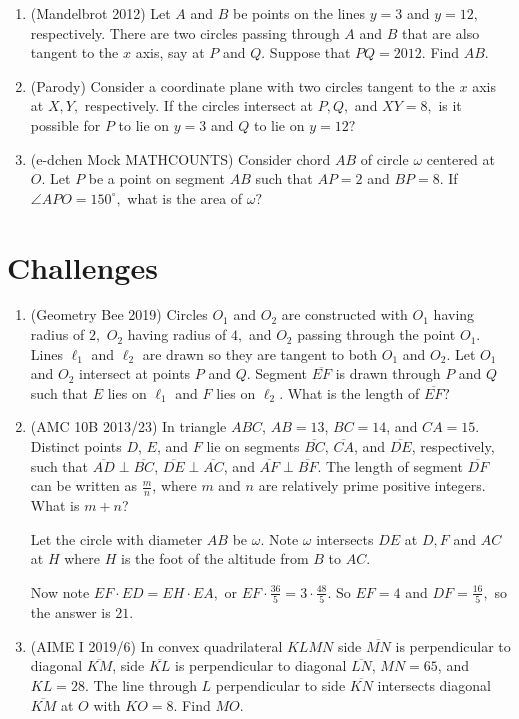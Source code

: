 \begin{enumerate}
\item (Mandelbrot 2012) Let $A$ and $B$ be points on the lines $y=3$ and $y=12,$ respectively. There are two circles passing through $A$ and $B$ that are also tangent to the $x$ axis, say at $P$ and $Q.$ Suppose that $PQ=2012.$ Find $AB.$

\item (Parody) Consider a coordinate plane with two circles tangent to the $x$ axis at $X,Y,$ respectively. If the circles intersect at $P,Q,$ and $XY=8,$ is it possible for $P$ to lie on $y=3$ and $Q$ to lie on $y=12?$

\item (e-dchen Mock MATHCOUNTS) Consider chord $AB$ of circle $\omega$ centered at $O.$ Let $P$ be a point on segment $AB$ such that $AP=2$ and $BP=8$. If $\angle APO=150^{\circ},$ what is the area of $\omega?$
\end{enumerate}

\section{Challenges}

\begin{enumerate}
	\item (Geometry Bee 2019) Circles $O_1$ and $O_2$ are constructed with $O_1$ having radius of $2,$ $O_2$ having radius of $4,$ and $O_2$ passing through the point $O_1.$ Lines $\ell_1$ and $\ell_2$ are drawn so they are tangent to both $O_1$ and $O_2.$ Let $O_1$ and $O_2$ intersect at points $P$ and $Q.$ Segment $\overline{EF}$ is drawn through $P$ and $Q$ such that $E$ lies on $\ell_1$ and $F$ lies on $\ell_2.$ What is the length of $\overline{EF}?$
	
\item (AMC 10B 2013/23) In triangle $ABC$, $AB=13$, $BC=14$, and $CA=15$. Distinct points $D$, $E$, and $F$ lie on segments $\overline{BC}$, $\overline{CA}$, and $\overline{DE}$, respectively, such that $\overline{AD}\perp\overline{BC}$, $\overline{DE}\perp\overline{AC}$, and $\overline{AF}\perp\overline{BF}$. The length of segment $\overline{DF}$ can be written as $\frac{m}{n}$, where $m$ and $n$ are relatively prime positive integers. What is $m+n$?
\begin{solu}
\begin{addsol}
{Let the circle with diameter $AB$ be $\omega.$ Note $\omega$ intersects $DE$ at $D,F$ and $AC$ at $H$ where $H$ is the foot of the altitude from $B$ to $AC.$

Now note $EF\cdot ED=EH\cdot EA,$ or $EF\cdot \frac{36}{5}=3\cdot \frac{48}{5}.$ So $EF=4$ and $DF=\frac{16}{5},$ so the answer is $21.$}
\end{addsol}
\end{solu}

\item (AIME I 2019/6) In convex quadrilateral $KLMN$ side $\overline{MN}$ is perpendicular to diagonal $\overline{KM}$, side $\overline{KL}$ is perpendicular to diagonal $\overline{LN}$, $MN = 65$, and $KL = 28$. The line through $L$ perpendicular to side $\overline{KN}$ intersects diagonal $\overline{KM}$ at $O$ with $KO = 8$. Find $MO$.
\end{enumerate}